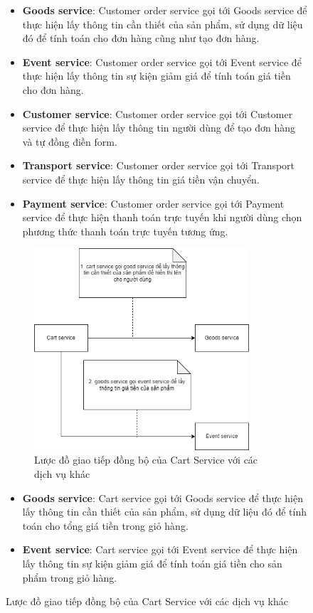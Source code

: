 \begin{figure}[!htp]
\begin{itemize}
	\item \textbf{Goods service}: Customer order service gọi tới Goods service để thực hiện lấy thông tin cần thiết của sản phẩm, sử dụng dữ liệu đó để tính toán cho đơn hàng cũng như tạo đơn hàng.
	\item \textbf{Event service}: Customer order service gọi tới Event service để thực hiện lấy thông tin sự kiện giảm giá để tính toán giá tiền cho đơn hàng.
	\item \textbf{Customer service}: Customer order service gọi tới Customer service để thực hiện lấy thông tin người dùng để tạo đơn hàng và tự đồng điền form.
	\item \textbf{Transport service}: Customer order service gọi tới Transport service để thực hiện lấy thông tin giá tiền vận chuyển.
	\item \textbf{Payment service}: Customer order service gọi tới Payment service để thực hiện thanh toán trực tuyến khi người dùng chọn phương thức thanh toán trực tuyến tương ứng.
\end{itemize}


\begin{figure}[!htp]
	\centering
	\includegraphics[width=8cm]{img/Architecture/service/cart-call.png}
	\newline
	\caption{Lược đồ giao tiếp đồng bộ của Cart Service với các dịch vụ khác}
\end{figure}

\begin{itemize}
	\item \textbf{Goods service}: Cart service gọi tới Goods service để thực hiện lấy thông tin cần thiết của sản phẩm, sử dụng dữ liệu đó để tính toán cho tổng giá tiền trong giỏ hàng.
	\item \textbf{Event service}: Cart service gọi tới Event service để thực hiện lấy thông tin sự kiện giảm giá để tính toán giá tiền cho sản phẩm trong giỏ hàng.
\end{itemize}


\end{figure}
